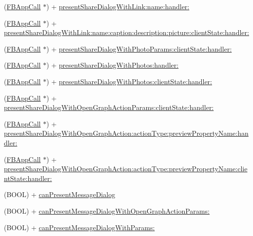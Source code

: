 \begin{DoxyCompactItemize}
\item 
(\hyperlink{interfaceFBAppCall}{F\+B\+App\+Call} $\ast$) + \hyperlink{interfaceFBDialogs_a5f935e0fdc377b269f9cf021e242f72e}{present\+Share\+Dialog\+With\+Link\+:name\+:handler\+:}
\item 
(\hyperlink{interfaceFBAppCall}{F\+B\+App\+Call} $\ast$) + \hyperlink{interfaceFBDialogs_aaed28cb89925f451c2d8bab8f1b44e22}{present\+Share\+Dialog\+With\+Link\+:name\+:caption\+:description\+:picture\+:client\+State\+:handler\+:}
\item 
(\hyperlink{interfaceFBAppCall}{F\+B\+App\+Call} $\ast$) + \hyperlink{interfaceFBDialogs_ad8f870b0c951157f3f3c9de5f42031ae}{present\+Share\+Dialog\+With\+Photo\+Params\+:client\+State\+:handler\+:}
\item 
(\hyperlink{interfaceFBAppCall}{F\+B\+App\+Call} $\ast$) + \hyperlink{interfaceFBDialogs_aeaf0798a6057ed03c6a3cc26aa624a27}{present\+Share\+Dialog\+With\+Photos\+:handler\+:}
\item 
(\hyperlink{interfaceFBAppCall}{F\+B\+App\+Call} $\ast$) + \hyperlink{interfaceFBDialogs_abc4827f34c1e7e82b34216e6b9330cd8}{present\+Share\+Dialog\+With\+Photos\+:client\+State\+:handler\+:}
\item 
(\hyperlink{interfaceFBAppCall}{F\+B\+App\+Call} $\ast$) + \hyperlink{interfaceFBDialogs_a2fd765d39b1e4e4a9d4252762694b2b9}{present\+Share\+Dialog\+With\+Open\+Graph\+Action\+Params\+:client\+State\+:handler\+:}
\item 
(\hyperlink{interfaceFBAppCall}{F\+B\+App\+Call} $\ast$) + \hyperlink{interfaceFBDialogs_a17f88dc21a7f13474d310e4dd3e0d781}{present\+Share\+Dialog\+With\+Open\+Graph\+Action\+:action\+Type\+:preview\+Property\+Name\+:handler\+:}
\item 
(\hyperlink{interfaceFBAppCall}{F\+B\+App\+Call} $\ast$) + \hyperlink{interfaceFBDialogs_ad40b913195e68f5449fb0afab6c5a4b5}{present\+Share\+Dialog\+With\+Open\+Graph\+Action\+:action\+Type\+:preview\+Property\+Name\+:client\+State\+:handler\+:}
\item 
(B\+O\+OL) + \hyperlink{interfaceFBDialogs_aa41db27dd00b0c59e01d45f72b9045aa}{can\+Present\+Message\+Dialog}
\item 
(B\+O\+OL) + \hyperlink{interfaceFBDialogs_abc596dd117701ceb160dd63db514cf11}{can\+Present\+Message\+Dialog\+With\+Open\+Graph\+Action\+Params\+:}
\item 
(B\+O\+OL) + \hyperlink{interfaceFBDialogs_a81544299ca98179464ec34fc0e8d12b7}{can\+Present\+Message\+Dialog\+With\+Params\+:}
\item 

\end{DoxyCompactItemize}
